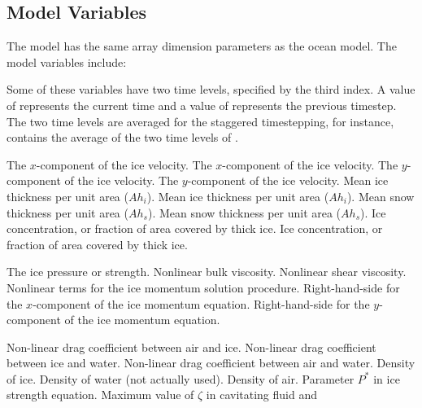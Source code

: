 \subsection{Model Variables}
The model has the same array dimension parameters as the ocean model.
The model variables include:
\begin{klist}
   Some of these variables have two time levels,
specified by the third index.  A value of  represents the
current time and a value of  represents the previous
timestep.  The two time levels are averaged for the staggered
timestepping, for instance,  contains the average of
the two time levels of .
  \begin{klist}
             The $x$-component of the ice velocity.
           The $x$-component of the ice velocity.
             The $y$-component of the ice velocity.
           The $y$-component of the ice velocity.
             Mean ice thickness per unit area ($A h_i$).
           Mean ice thickness per unit area ($A h_i$).
            Mean snow thickness per unit area ($A h_s$).
          Mean snow thickness per unit area ($A h_s$).
             Ice concentration, or fraction of area
  covered by thick ice.
           Ice concentration, or fraction of area
  covered by thick ice.
  \end{klist}
   \mbox{}
  \begin{klist}
           The ice pressure or strength.
          Nonlinear bulk viscosity.
            Nonlinear shear viscosity.
     Nonlinear terms for the ice momentum
  solution procedure.
          Right-hand-side for the $x$-component of the ice
  momentum equation.
          Right-hand-side for the $y$-component of the ice
  momentum equation.
  \end{klist}
   \mbox{}
  \begin{klist}
       Non-linear drag coefficient between air and ice.
       Non-linear drag coefficient between ice and water.
       Non-linear drag coefficient between air and water.
     Density of ice.
     Density of water (not actually used).
     Density of air.
      Parameter $P^*$ in ice strength equation.
     Maximum value of $\zeta$ in cavitating fluid and

\end{klist}
\end{klist}
